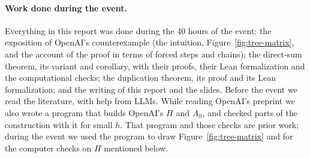 \documentclass{article}
\theoremstyle{plain}
\theoremstyle{definition}
\begin{document}
\paragraph{Work done during the event.} Everything in this report was done during the 40 hours of
the event: the exposition of OpenAI's counterexample (the intuition, Figure~\ref{fig:tree-matrix},
and the account of the proof in terms of forced steps and chains); the direct-sum theorem, its
variant and corollary, with their proofs, their Lean formalization and the computational checks;
the duplication theorem, its proof and its Lean formalization; and the writing of this report and the slides. Before the
event we read the literature, with help from LLMs. While reading OpenAI's preprint we also wrote a
program that builds OpenAI's $H$ and $A_h$, and checked parts of the construction with it for small
$h$. That program and those checks are prior work; during the event we used the program to draw
Figure~\ref{fig:tree-matrix} and for the computer checks on $H$ mentioned below.

\end{document}
